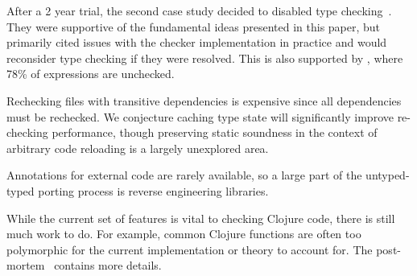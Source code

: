 After a 2 year trial, the second case study decided to disabled type checking~\cite{CircleCIBlog}.
They were supportive of the fundamental ideas presented in this paper, but primarily
cited issues with the checker implementation in practice and would reconsider
type checking if they were resolved. This is also supported by ,
where 78\% of  expressions are unchecked.

Rechecking files with transitive dependencies is expensive since all dependencies must be rechecked.
We conjecture caching type state will significantly
improve re-checking performance,
though preserving static soundness in the context of arbitrary code reloading is a largely unexplored area.

Annotations for external code are rarely available, so a large part of the
untyped-typed porting process is reverse engineering libraries.

While the current set of features is vital to checking Clojure code,
there is still much work to do.
For example, common Clojure functions are often too polymorphic for the current implementation
or theory to account for. The post-mortem~\cite{CircleCIBlog} contains more details.

%

%



